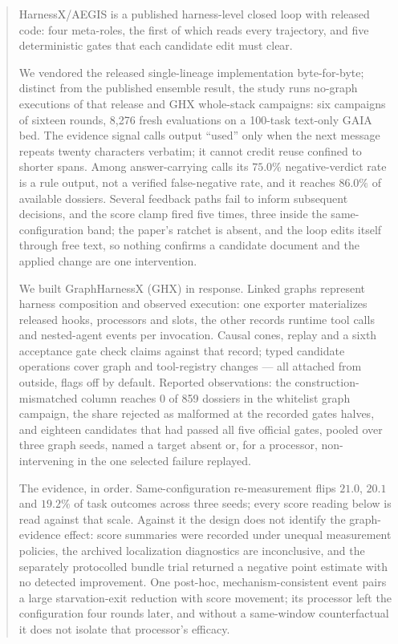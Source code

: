 \begin{abstract}
\singlespacing\noindent
HarnessX/AEGIS is a
published harness-level closed loop with released code: four meta-roles,
the first of which reads every trajectory, and five deterministic gates
that each candidate edit must clear.

We vendored the released single-lineage implementation byte-for-byte; distinct from
the published ensemble result, the study runs no-graph executions of that release and
GHX whole-stack campaigns: six campaigns of sixteen rounds, 8{,}276 fresh evaluations on a
100-task text-only GAIA bed. The evidence signal calls output ``used'' only when the next message
repeats twenty characters verbatim; it cannot credit reuse confined to shorter
spans. Among answer-carrying calls its $75.0\%$ negative-verdict rate is a rule
output, not a verified false-negative rate, and it reaches $86.0\%$ of available dossiers. Several feedback paths fail to inform subsequent decisions,
and the score clamp fired five times, three inside the same-configuration
band; the paper's ratchet is absent, and the loop edits itself through free
text, so nothing confirms a candidate document and the applied change are
one intervention.

We built GraphHarnessX (GHX) in response. Linked graphs represent harness
composition and observed execution: one exporter materializes released
hooks, processors and slots, the other records runtime tool calls and
nested-agent events per invocation. Causal cones, replay and a sixth
acceptance gate check claims against that record; typed candidate operations
cover graph and tool-registry changes --- all attached from outside, flags
off by default. Reported observations: the construction-mismatched column reaches 0 of 859 dossiers
in the whitelist graph campaign, the share rejected as malformed at the recorded gates halves, and eighteen candidates that had passed all five official gates, pooled over
three graph seeds, named a target absent or, for a processor, non-intervening
in the one selected failure replayed.

The evidence, in order. Same-configuration re-measurement flips $21.0$,
$20.1$ and $19.2\%$ of task outcomes across three seeds; every score
reading below is read against that scale. Against it the design does not
identify the graph-evidence effect: score summaries were recorded under
unequal measurement policies, the archived localization diagnostics are
inconclusive, and the separately protocolled bundle trial returned a
negative point estimate with no detected improvement. One post-hoc,
mechanism-consistent event pairs a large starvation-exit reduction with
score movement; its processor left the configuration four rounds later,
and without a same-window counterfactual it does not isolate that
processor's efficacy.


\end{abstract}
